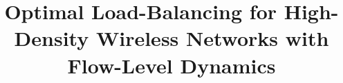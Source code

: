 \documentclass[10pt, conference, letterpaper]{IEEEtran} %
\begin{document}
\title{Optimal Load-Balancing for High-Density Wireless Networks with Flow-Level Dynamics
\author{
}}




\date{}

\maketitle
\newtheorem{theorem}{Theorem}
\newtheorem{lemma}{Lemma}
\newtheorem{claim}{Claim}
\newtheorem{proposition}{Proposition}
\newtheorem{corollary}{Corollary}
\newtheorem{definition}{Definition}
\newtheorem{assumption}{Assumption}
\newtheorem{remarks}{Remarks}
\newtheorem{algorithm}{Algorithm}

\newcommand{\cS}{\mathcal{S}}
\newcommand{\vS}{\mathbf{S}}
\newcommand{\vQ}{\mathbf{Q}}
\newcommand{\bE}{\mathds{E}}
\newcommand{\mc}{\mathcal}
\newcommand{\mb}{\mathbf}
\newcommand{\bs}{\boldsymbol}
\newcommand{\ol}{\overline}
\newcommand{\wt}{\widetilde}
\end{document}
